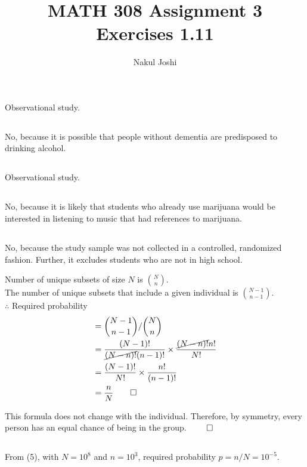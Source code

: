 \documentclass[twocolumn]{article}
\title{MATH 308 Assignment 3\\Exercises 1.11}
\author{Nakul Joshi}
\begin{document}
\maketitle

\subsection{} Observational study.
\subsection{} No, because it is possible that people without dementia are predisposed to drinking alcohol.

\subsection{} Observational study.
\subsection{} No, because it is likely that students who already use marijuana would be interested in listening to music that had references to marijuana.
\subsection{} No, because the study sample was not collected in a controlled, randomized fashion. Further, it excludes students who are not in high school.

Number of unique subsets of size $N$ is $\binom{N}{n}$.\\
The number of unique subsets that include a given individual is $\binom{N-1}{n-1}$.\\
$\therefore$ Required probability\begin{align*}
	&=\binom{N-1}{n-1}/\binom{N}{n}\\
	&=\frac{(N-1)!}{\cancel{(N-n)!}(n-1)!}\times\frac{\cancel{(N-n)!}n!}{N!}\\
	&=\frac{(N-1)!}{N!}\times\frac{n!}{(n-1)!}\\
	&=\frac{n}{N} \qed
\end{align*}

This formula does not change with the individual. Therefore, by symmetry, every person has an equal chance of being in the group. $\qed$

\subsection{} From (5), with $N=10^8$ and $n=10^3$, required probability $p= n/N=10^{-5}$.
\end{document}
